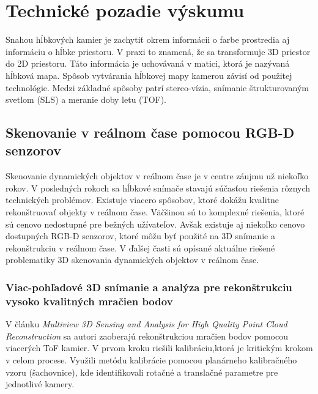 
\chapter{Technické pozadie výskumu} 
\label{kap:technické_pozadie}
\pagestyle{fancy}
\fancyhf{}
\fancyfoot[CE,CO]{\thepage}
\renewcommand{\footrulewidth}{1pt}

Snahou hĺbkových kamier je zachytiť okrem informácii o farbe prostredia aj informáciu o hĺbke priestoru. V praxi to znamená, že sa transformuje 3D priestor do 2D priestoru. Táto informácia je uchovávaná v matici, ktorá je nazývaná hĺbková mapa. Spôsob vytvárania hĺbkovej mapy kamerou závisí od použitej technológie. Medzi základné spôsoby patrí stereo-vízia, snímanie štrukturovaným svetlom (SLS) a meranie doby letu (TOF).

\section{Skenovanie v reálnom čase pomocou \mbox{RGB-D} senzorov}

Skenovanie dynamických objektov v reálnom čase je v centre záujmu už niekoľko rokov. V posledných rokoch sa hĺbkové snímače stavajú súčasťou riešenia rôznych technických problémov. Existuje viacero spôsobov, ktoré dokážu kvalitne rekonštruovať objekty v reálnom čase. Väčšinou sú to komplexné riešenia, ktoré sú cenovo nedostupné pre bežných užívateľov. Avšak existuje aj niekoľko cenovo dostupných RGB-D senzorov, ktoré môžu byť použité na 3D snímanie a rekonštrukciu v reálnom čase. V ďalšej časti sú opísané aktuálne riešené problematiky 3D skenovania dynamických objektov v reálnom čase. 

\newpage
\subsection{Viac-pohľadové 3D snímanie a analýza pre rekonštrukciu vysoko kvalitných mračien bodov}

V článku \textit{Multiview 3D Sensing and Analysis for High Quality Point Cloud Reconstruction} sa autori zaoberajú rekonštrukciou mračien bodov pomocou viacerých ToF kamier. 
V prvom kroku riešili kalibráciu,ktorá je kritickým krokom v celom procese. Využili metódu kalibrácie pomocou planárneho kalibračného vzoru (šachovnice), kde identifikovali rotačné a translačné parametre pre jednotlivé kamery. 

